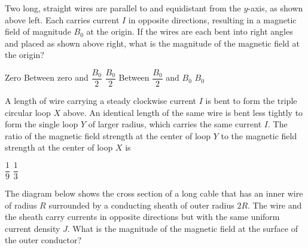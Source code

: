 \documentclass[12pt]{../oss-classkick-exam}
\begin{document}
\begin{questions}
  \question Two long, straight wires are parallel to and equidistant from the
  $y$-axis, as shown above left. Each carries current $I$ in opposite
  directions, resulting in a magnetic field of magnitude $B_0$ at the origin.
  If the wires are each bent into right angles and placed as shown above right,
  what is the magnitude of the magnetic field at the origin?
  \begin{choices}
    \choice Zero
    \choice Between zero and $\dfrac{B_0}2$
    \choice $\dfrac{B_0}2$
    \choice Between $\dfrac{B_0}2$ and $B_0$
    \choice  $B_0$
    \end{choices}


  \question A length of wire carrying a steady clockwise current $I$ is bent
  to form the triple circular loop $X$ above. An identical length of the same
  wire is bent less tightly to form the single loop $Y$ of larger radius, which
  carries the same current $I$. The ratio of the magnetic field strength at the
  center of loop $Y$ to the magnetic field strength at the center of loop $X$ is
  \begin{choices}
    \choice $\dfrac19$
    \choice $\dfrac13$
  \end{choices}

  \uplevel{\rule{\linewidth}{.5pt}}
  
  \question The diagram below shows the cross section of a long cable that has
  an inner wire of radius $R$ surrounded by a conducting sheath of outer radius
  $2R$. The wire and the sheath carry currents in opposite directions but with
  the same uniform current density $J$. What is the magnitude of the magnetic
  field at the surface of the outer conductor?
  

\end{questions}
\end{document}
